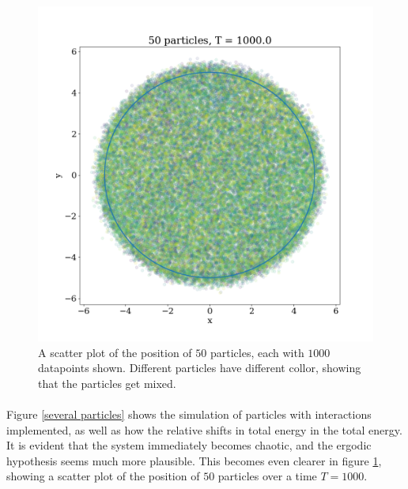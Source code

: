 \documentclass{article}
\begin{document}
        \begin{figure}
            
            \includegraphics[width = \textwidth]{scatter}
            \vspace{-30pt}
            \caption{A scatter plot of the position of $50$ particles, each with $1000$ datapoints shown. Different particles have different collor, showing that the particles get mixed.}
            \label{scatter}

        \end{figure}

        \paragraph*{}
        Figure \ref{several particles} shows the simulation of particles with interactions implemented, as well as how the relative shifts in total energy in the total energy. It is evident that the system immediately becomes chaotic, and the ergodic hypothesis seems much more plausible. This becomes even clearer in figure \ref{scatter}, showing a scatter plot of the position of $50$ particles over a time $T = 1000$. 
\end{document}
